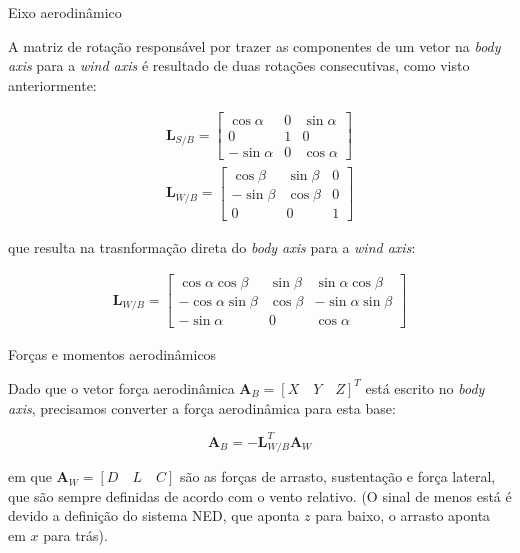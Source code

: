 \documentclass{beamer}
\begin{document}
\begin{frame}{Eixo aerodinâmico}

    A matriz de rotação responsável por trazer as componentes de um vetor na \textit{body axis} para a \textit{wind axis} é resultado de duas rotações consecutivas, como visto anteriormente:

     \begin{gather*}
        \mathbf L_{S/B} = 
        \begin{bmatrix}
            \cos\alpha & 0 & \sin\alpha \\
            0 & 1 & 0 \\
            -\sin\alpha & 0 & \cos\alpha
        \end{bmatrix} \\[10pt]
        \mathbf L_{W/B} = 
        \begin{bmatrix}
            \cos\beta & \sin\beta & 0 \\
            -\sin\beta & \cos\beta & 0 \\
            0 & 0 & 1
        \end{bmatrix}
    \end{gather*}

    \justifying
    que resulta na trasnformação direta do \textit{body axis} para a \textit{wind axis}:

    \begin{gather*}
        \mathbf{L}_{W/B} = 
        \begin{bmatrix}
        \cos\alpha \cos\beta & \sin\beta & \sin\alpha \cos\beta \\
        -\cos\alpha \sin\beta & \cos\beta & -\sin\alpha \sin\beta \\
        -\sin\alpha & 0 & \cos\alpha
        \end{bmatrix}
    \end{gather*}

\end{frame}


\begin{frame}{Forças e momentos aerodinâmicos}

    Dado que o vetor força aerodinâmica $\mathbf A_B = [X \quad Y \quad Z]^T $ está escrito no \textit{body axis}, precisamos converter a força aerodinâmica para esta base:

    \begin{equation*}
        \mathbf A_B = - \mathbf L_{W/B}^T \mathbf A_W
    \end{equation*}

    \justifying
    em que $\mathbf A_W = [D \quad L \quad C]$ são as forças de arrasto, sustentação e força lateral, que são sempre definidas de acordo com o vento relativo. (O sinal de menos está é devido a definição do sistema NED, que aponta $z$ para baixo, o arrasto aponta em $x$ para trás).
    
\end{frame}
\end{document}
